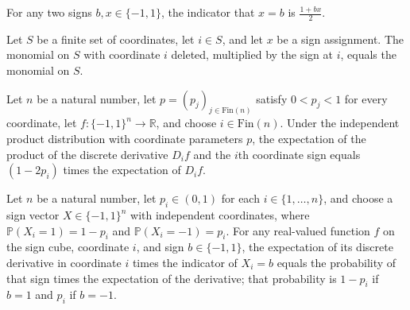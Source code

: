 \begin{theorem}
\label{FABL.sign_eq_indicator_formula}
\leanok
{}
For any two signs $b,x\in\{-1,1\}$, the indicator that $x=b$ is $\frac{1+bx}{2}$.
\end{theorem}

\begin{theorem}
\label{FABL.monomial_erase_mul_coordinate}
\leanok
{}
Let $S$ be a finite set of coordinates, let $i\in S$, and let $x$ be a sign assignment.
The monomial on $S$ with coordinate $i$ deleted, multiplied by the sign at $i$, equals
the monomial on $S$.
\end{theorem}

\begin{theorem}
\label{FABL.pmfExpectation_heterogeneousBiasedSignPMF_discreteDerivative_mul_sign}
\leanok
{}
Let $n$ be a natural number, let $p=(p_j)_{j\in\mathrm{Fin}(n)}$ satisfy $0<p_j<1$ for
every coordinate, let $f:\{-1,1\}^n\to\mathbb{R}$, and choose $i\in\mathrm{Fin}(n)$.
Under the independent product distribution with coordinate parameters $p$, the
expectation of the product of the discrete derivative $D_i f$ and the $i$th coordinate
sign equals $(1-2p_i)$ times the expectation of $D_i f$.
\end{theorem}

\begin{theorem}
\label{FABL.pmfExpectation_discreteDerivative_mul_coordinateIndicator}
\leanok
{}
Let $n$ be a natural number, let $p_i\in(0,1)$ for each $i\in\{1,\ldots,n\}$, and choose
a sign vector $X\in\{-1,1\}^n$ with independent coordinates, where
$\mathbb{P}(X_i=1)=1-p_i$ and $\mathbb{P}(X_i=-1)=p_i$. For any real-valued function $f$
on the sign cube, coordinate $i$, and sign $b\in\{-1,1\}$, the expectation of its
discrete derivative in coordinate $i$ times the indicator of $X_i=b$ equals the
probability of that sign times the expectation of the derivative; that probability is
$1-p_i$ if $b=1$ and $p_i$ if $b=-1$.
\end{theorem}

